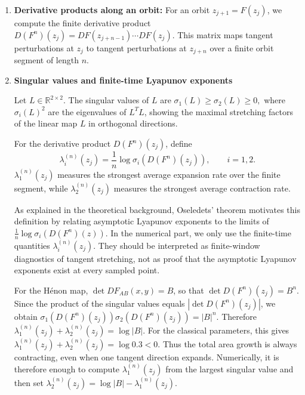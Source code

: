 \begin{enumerate}
    \item \textbf{Derivative products along an orbit:}
    For an orbit \(z_{j+1}=F(z_j)\), we compute the finite derivative product
    \(D(F^n)(z_j)=DF(z_{j+n-1})\cdots DF(z_j).
    \) This matrix maps tangent perturbations at \(z_j\) to tangent perturbations at \(z_{j+n}\) over a finite orbit segment of length \(n\).

    \item \textbf{Singular values and finite-time Lyapunov exponents}

        Let \(L\in\mathbb R^{2\times 2}\). The singular values of \(L\) are \(\sigma_1(L)\geq \sigma_2(L)\geq 0,\)
        where \(\sigma_i(L)^2\) are the eigenvalues of \(L^TL\), showing the maximal stretching factors of the linear map \(L\) in orthogonal directions.
        
        
        For the derivative product \(D(F^n)(z_j)\), define
        \[
        \lambda_i^{(n)}(z_j)
        =
        \frac1n\log\sigma_i(D(F^n)(z_j)),
        \qquad i=1,2.
        \]
        \(\lambda_1^{(n)}(z_j)\) measures the strongest average expansion rate over the finite segment, while \(\lambda_2^{(n)}(z_j)\) measures the strongest average contraction rate.
        
        As explained in the theoretical background, Oseledets' theorem motivates this definition by relating asymptotic Lyapunov exponents to the limits of \(\frac1n\log \sigma_i(D(F^n)(z)).\) In the numerical part, we only use the finite-time quantities \(\lambda_i^{(n)}(z_j)\). They should be interpreted as finite-window diagnostics of tangent stretching, not as proof that the asymptotic Lyapunov exponents exist at every sampled point.
        
        \begin{remark}
        For the Hénon map, \(\det DF_{AB}(x,y)=B\), so that \(\det D(F^n)(z_j)=B^n.\)
        Since the product of the singular values equals \(|\det D(F^n)(z_j)|\), we obtain
        \(
        \sigma_1(D(F^n)(z_j))\sigma_2(D(F^n)(z_j))= |B|^n.\) Therefore \(\lambda_1^{(n)}(z_j)+\lambda_2^{(n)}(z_j)=\log |B|.\)
        For the classical parameters, this gives
        \(
        \lambda_1^{(n)}(z_j)+\lambda_2^{(n)}(z_j)=\log 0.3<0.\)
        Thus the total area growth is always contracting, even when one tangent direction expands. Numerically, it is therefore enough to compute \(\lambda_1^{(n)}(z_j)\) from the largest singular value and then set \(\lambda_2^{(n)}(z_j)=\log|B|-\lambda_1^{(n)}(z_j).\)
        \end{remark}


\end{enumerate}
